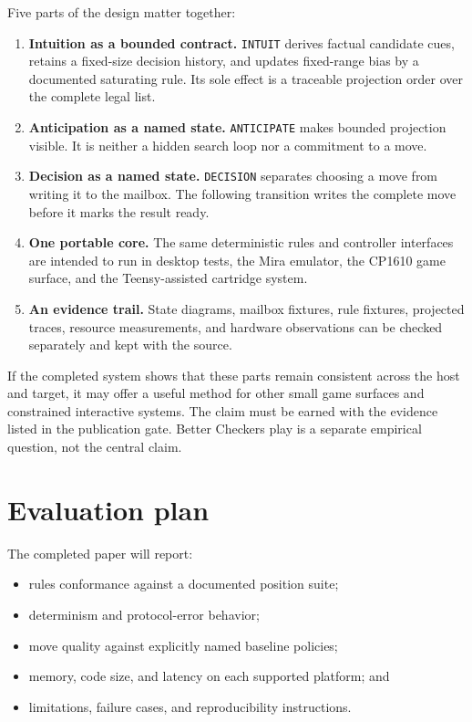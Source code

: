 \documentclass[11pt]{article}
\begin{document}
Five parts of the design matter together:
\begin{enumerate}
  \item \textbf{Intuition as a bounded contract.} \texttt{INTUIT} derives
  factual candidate cues, retains a fixed-size decision history, and updates
  fixed-range bias by a documented saturating rule. Its sole effect is a
  traceable projection order over the complete legal list.
  \item \textbf{Anticipation as a named state.} \texttt{ANTICIPATE} makes
  bounded projection visible. It is neither a hidden search loop nor a
  commitment to a move.
  \item \textbf{Decision as a named state.} \texttt{DECISION} separates
  choosing a move from writing it to the mailbox. The following transition
  writes the complete move before it marks the result ready.
  \item \textbf{One portable core.} The same deterministic rules and
  controller interfaces are intended to run in desktop tests, the Mira
  emulator, the CP1610 game surface, and the Teensy-assisted cartridge
  system.
  \item \textbf{An evidence trail.} State diagrams, mailbox fixtures,
  rule fixtures, projected traces, resource measurements, and hardware
  observations can be checked separately and kept with the source.
\end{enumerate}

If the completed system shows that these parts remain consistent across the
host and target, it may offer a useful method for other small game surfaces
and constrained interactive systems. The claim must be earned with the
evidence listed in the publication gate. Better Checkers play is a separate
empirical question, not the central claim.

\section{Evaluation plan}

The completed paper will report:
\begin{itemize}
  \item rules conformance against a documented position suite;
  \item determinism and protocol-error behavior;
  \item move quality against explicitly named baseline policies;
  \item memory, code size, and latency on each supported platform; and
  \item limitations, failure cases, and reproducibility instructions.
\end{itemize}
\end{document}
